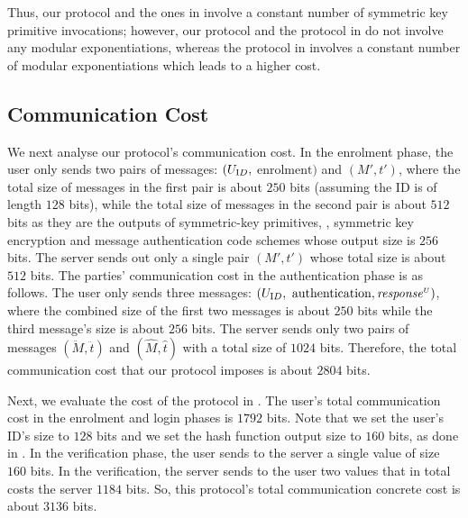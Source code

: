 Thus,  our protocol and the ones in \cite{WangW18,JareckiJKSS21,MatsuoMY11} involve a constant number of symmetric key primitive invocations; however, our protocol and the protocol in \cite{MatsuoMY11} do not involve any modular exponentiations, whereas the protocol in  \cite{WangW18,JareckiJKSS21} involves a constant number of modular exponentiations which leads to a higher cost. 


\subsection{Communication Cost}


We next analyse our protocol's communication cost. In the enrolment phase,  the user only sends two pairs of messages: $(U_{\text ID}, $ $\text{enrolment})$ and $(M', t')$, where the total size of messages in the first pair is about $250$ bits (assuming the ID is of length $128$ bits),  while the total size of messages in the second pair is about  $512$ bits as they are the outputs of symmetric-key primitives, \ie, symmetric key encryption and message authentication code schemes whose output size is $256$ bits. The server sends out only a single pair $(M', t')$ whose total size is about $512$ bits. 
% 
The parties' communication cost in the authentication phase is as follows. The user only sends three messages: $(U_{\text ID}, $ $\text{authentication}, \mathit{response}^{\scriptscriptstyle U})$, where the combined size of the first two messages is about $250$ bits while the third message's size is about $256$ bits. The server sends only two pairs of messages $(\ddot M, \ddot t)$ and $(\hat M, \hat t)$ with a total size of $1024$ bits. Therefore, the total communication cost that our protocol imposes is about $2804$ bits. 

Next, we evaluate the cost of the protocol in \cite{WangW18}. The user's total communication cost in the enrolment and login phases is $1792$ bits. Note that we set the user's ID's size to $128$ bits and we set the hash function output size to $160$ bits, as done in \cite{WangW18}. In the verification phase, the user sends to the server a single value of size $160$ bits. In the verification, the server sends to the user two values that in total costs the server $1184$ bits. So, this protocol's total communication concrete cost is about $3136$ bits.%


